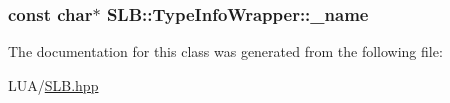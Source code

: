 \subsubsection[{\texorpdfstring{\+\_\+name}{_name}}]{\setlength{\rightskip}{0pt plus 5cm}const char$\ast$ S\+L\+B\+::\+Type\+Info\+Wrapper\+::\+\_\+name\hspace{0.3cm}{\ttfamily [private]}}\hypertarget{classSLB_1_1TypeInfoWrapper_a5b558bd25bd1b9ed34e7d830e85b27fb}{}\label{classSLB_1_1TypeInfoWrapper_a5b558bd25bd1b9ed34e7d830e85b27fb}


The documentation for this class was generated from the following file\+:\begin{DoxyCompactItemize}
\item 
L\+U\+A/\hyperlink{SLB_8hpp}{S\+L\+B.\+hpp}\end{DoxyCompactItemize}
